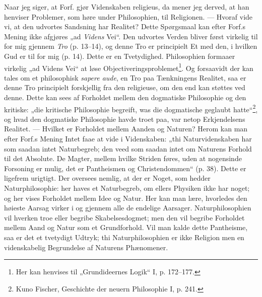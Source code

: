 \documentclass[12pt,a4paper]{book}
\newcommand{\opage}[1]{\marginnote{\footnotesize\textit{[#1]}}}
\begin{document}
Naar jeg siger, at Forf. gjør Videnskaben religieus, da
mener jeg derved, at han henviser Problemer, som høre under
Philosophien, til Religionen. --- Hvoraf vide vi, at den udvortes
Sandsning har Realitet? Dette Spørgsmaal kan efter Forf.s
Mening ikke afgjøres „ad \emph{Videns} Vei“. Den udvortes Verden
bliver først virkelig til for mig gjennem \emph{Tro} (p. 13--14), og
denne Tro er principielt Et med den, i hvilken Gud er til
for mig (p. 14). Dette er en Tvetydighed. Philosophien
formaaer virkelig „ad Videns Vei“ at løse Objectiveringsproblemet\footnote{Her kan henvises til „Grundideernes Logik“ I, p. 172--177.}.
Og forsaavidt der kan tales om et philosophisk
\opage{7}\setcounter{footnote}{0}%
\textit{sapere aude}, en Tro paa Tænkningens Realitet, saa er
denne Tro principielt forskjellig fra den religieuse, om den
end kan støttes ved denne. Dette kan sees af Forholdet
mellem den dogmatiske Philosophie og den kritiske: „die kritische
Philosophie begreift, was die dogmatische geglaubt hatte“\footnote{Kuno Fischer, Geschichte der neuern Philosophie I, p. 241.},
og hvad den dogmatiske Philosophie havde troet paa, var netop
Erkjendelsens Realitet. --- Hvilket er Forholdet mellem Aanden
og Naturen? Herom kan man efter Forf.s Mening Intet
faae at vide i Videnskaben: „thi Naturvidenskaben har som
saadan intet Naturbegreb; den veed som saadan intet om
Naturens Forhold til det Absolute. De Magter, mellem hvilke
Striden føres, uden at nogensinde Forsoning er mulig, det er
Pantheismen og Christendommen“ (p. 38). Dette er ligefrem
urigtigt. Der oversees nemlig, at der er Noget, som hedder
Naturphilosophie: her haves et Naturbegreb, om ellers Physiken
ikke har noget; og her vises Forholdet mellem Idee og Natur.
Her kan man lære, hvorledes den høieste Aarsag virker i og
gjennem alle de endelige Aarsager. Naturphilosophien vil hverken
troe eller begribe Skabelsesdogmet; men den vil begribe Forholdet
mellem Aand og Natur som et Grundforhold. Vil
man kalde dette Pantheisme, saa er det et tvetydigt Udtryk;
thi Naturphilosophien er ikke Religion men en videnskabelig
Begrundelse af Naturens Phænomener.
\end{document}

